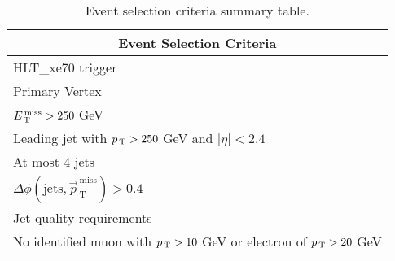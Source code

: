 \begin{table}[!th]
  \centering
  \begin{tabular}{l}
    \toprule
    \multicolumn{1}{c}{Event Selection Criteria} \\
    \midrule \midrule
    HLT\_xe70 trigger \\
    Primary Vertex \\
    $E_\mathrm{\, T}^\mathrm{\, miss} > 250~$GeV \\
    Leading jet with $p_\mathrm{\, T} > 250~$GeV and $|\eta| < 2.4$ \\
    At most 4 jets \\
    $\Delta \phi (\mathrm{jets}, \vec{p}_{\mathrm{\, T}}^{\mathrm{\, miss}}) >
    0.4$ \\
    Jet quality requirements \\
    No identified muon with $p_\mathrm{\, T} > 10~$GeV or electron of $p_\mathrm{\, T} > 20~$GeV \\
    \bottomrule
  \end{tabular}
  \caption{Event selection criteria summary table.}
  \label{tab:event_selection}
\end{table}
